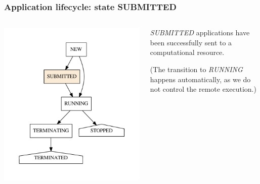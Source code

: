 \documentclass[english,serif,mathserif,xcolor=pdftex,dvipsnames,table]{beamer}
\begin{document}
\begin{frame}[fragile]
\frametitle{Application lifecycle: state SUBMITTED}

\begin{columns}[c]
  \begin{column}{0.5\textwidth}
    \includegraphics[height=0.7\textheight]{fig/states-SUBMITTED}
  \end{column}
  \begin{column}{0.5\textwidth}
    \raggedleft
    \emph{SUBMITTED} applications have been successfully sent to a
    computational resource.

    \+
    (The transition to \emph{RUNNING} happens automatically, as we
    do not control the remote execution.)
  \end{column}
\end{columns}
\end{frame}
\end{document}
